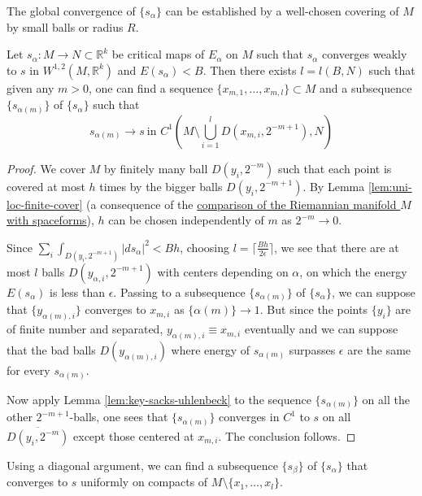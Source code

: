The global convergence of \(\{s_\alpha\}\) can be established by a well-chosen covering
of \(M\) by small balls or radius \(R\).

\begin{proposition}
\label{prop:2-sacks-uhlenbeck}
Let \(s_\alpha:M \longrightarrow N\subset \mathbb{R}^k\) be critical maps of \(E_\alpha\) on \(M\) such that \(s_\alpha\) converges weakly to \(s\) in \(W^{1,2}(M,
\mathbb{R}^k)\) and \(E(s_\alpha) < B\). Then there exists \(l=l(B,N)\) such that given any \(m>0\),
one can find a sequence \(\{x_{m,1},\dots, x_{m,l}\}\subset M\) and a subsequence \(\{s_{\alpha(m)}\}\) of \(\{s_\alpha\}\) such that
\[
 s_{\alpha(m)} \longrightarrow  s\ \text{in } C^1\left(M\setminus\bigcup_{i=1}^{l} D(x_{m,i}, 2^{-m+1}),N\right)
\]
\end{proposition}
\begin{proof}
We cover \(M\) by finitely many ball \(D(y_i, 2^{-m})\) such that each point is covered
at most \(h\) times by the bigger balls \(D(y_i,2^{-m+1})\). By Lemma
\ref{lem:uni-loc-finite-cover} (a consequence of the \href{sobolev-riemannian.org}{comparison of the Riemannian
manifold \(M\) with spaceforms}), \(h\) can be chosen independently of \(m\) as \(2^{-m} \to 0\).


Since \(\sum_i \int_{D(y_i, 2^{-m+1})} |ds_\alpha|^2 < B h\), choosing \(l = \lceil
\frac{Bh}{2\epsilon} \rceil\), we see that there are at most \(l\) balls \(D(y_{\alpha,i},
2^{-m+1})\) with centers depending on \(\alpha\), on which the energy \(E(s_\alpha)\) is less than
\(\epsilon\). Passing to a subsequence \(\{s_{\alpha(m)}\}\) of \(\{s_\alpha\}\),
we can suppose that \(\{y_{\alpha(m),i} \}\) converges to \(x_{m,i}\) as \(\{\alpha(m)\} \to 1\). But since the points \(\{y_i\}\) are of finite number and
separated, \(y_{\alpha(m),i}\equiv x_{m,i}\) eventually and we can suppose that the bad balls
\(D(y_{\alpha(m),i})\) where energy of \(s_{\alpha(m)}\) surpasses \(\epsilon\) are
the same for every \(s_{\alpha(m)}\).

Now apply Lemma \ref{lem:key-sacks-uhlenbeck} to the sequence \(\{s_{\alpha(m)}\}\) on all
the other \(2^{-m+1}\)-balls, one sees that \(\{s_{\alpha(m)}\}\) converges in \(C^1\) to \(s\) on all \(\overline{D(y_i, 2^{-m})}\) except those centered at \(x_{m,i}\). The conclusion follows.
\end{proof}

Using a diagonal argument, we can find a subsequence \(\{s_\beta\}\) of \(\{s_\alpha\}\) that converges to \(s\) uniformly on compacts of \(M\setminus \{x_1,\dots, x_l\}\).


